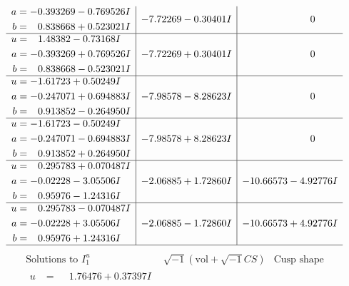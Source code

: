 \documentclass[1p]{elsarticle_modified}
\theoremstyle{definition}
\newcommand{\I}{\sqrt{-1}}
\begin{document}
$$\begin{array}{c|c|c}
\begin{aligned}
a &= -0.393269 - 0.769526 I \\
b &= \phantom{-}0.838668 + 0.523021 I\end{aligned}
 & -7.72269 - 0.30401 I & \phantom{-0.000000 } 0 \\ \hline\begin{aligned}
u &= \phantom{-}1.48382 - 0.73168 I \\
a &= -0.393269 + 0.769526 I \\
b &= \phantom{-}0.838668 - 0.523021 I\end{aligned}
 & -7.72269 + 0.30401 I & \phantom{-0.000000 } 0 \\ \hline\begin{aligned}
u &= -1.61723 + 0.50249 I \\
a &= -0.247071 + 0.694883 I \\
b &= \phantom{-}0.913852 - 0.264950 I\end{aligned}
 & -7.98578 - 8.28623 I & \phantom{-0.000000 } 0 \\ \hline\begin{aligned}
u &= -1.61723 - 0.50249 I \\
a &= -0.247071 - 0.694883 I \\
b &= \phantom{-}0.913852 + 0.264950 I\end{aligned}
 & -7.98578 + 8.28623 I & \phantom{-0.000000 } 0 \\ \hline\begin{aligned}
u &= \phantom{-}0.295783 + 0.070487 I \\
a &= -0.02228 - 3.05506 I \\
b &= \phantom{-}0.95976 - 1.24316 I\end{aligned}
 & -2.06885 + 1.72860 I & -10.66573 - 4.92776 I \\ \hline\begin{aligned}
u &= \phantom{-}0.295783 - 0.070487 I \\
a &= -0.02228 + 3.05506 I \\
b &= \phantom{-}0.95976 + 1.24316 I\end{aligned}
 & -2.06885 - 1.72860 I & -10.66573 + 4.92776 I\\
 \hline 
 \end{array}$$\newpage$$\begin{array}{c|c|c}  
\text{Solutions to }I^u_{1}& \I (\text{vol} + \sqrt{-1}CS) & \text{Cusp shape}\\
 \hline 
\begin{aligned}
u &= \phantom{-}1.76476 + 0.37397 I \\

\end{aligned}
\end{array}$$
\end{document}
